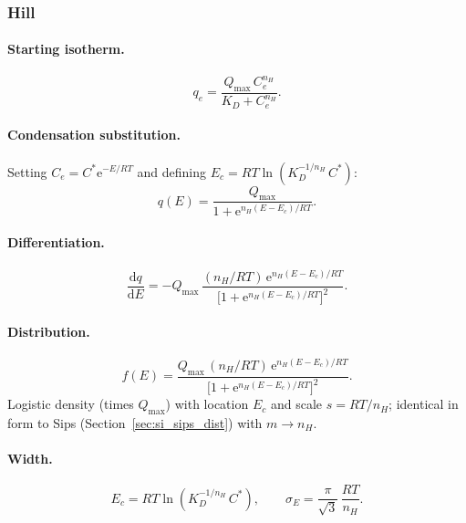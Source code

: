 \documentclass[journal=jacsat,manuscript=article]{achemso}
\begin{document}
\subsubsection{Hill}

\paragraph{Starting isotherm.}
\begin{equation}
	q_e = \frac{Q_{\max}\,C_e^{n_H}}{K_D + C_e^{n_H}}.
\end{equation}

\paragraph{Condensation substitution.}
Setting $C_e = C^{\ast}\mathrm{e}^{-E/RT}$ and defining
$E_c = RT\ln(K_D^{-1/n_H}\,C^{\ast})$:
\begin{equation}
	q(E) = \frac{Q_{\max}}{1+\mathrm{e}^{n_H(E-E_c)/RT}}.
\end{equation}

\paragraph{Differentiation.}
\begin{equation}
	\frac{\mathrm{d}q}{\mathrm{d}E}
	= -Q_{\max}\,\frac{(n_H/RT)\,\mathrm{e}^{n_H(E-E_c)/RT}}
	           {\bigl[1+\mathrm{e}^{n_H(E-E_c)/RT}\bigr]^{2}}.
\end{equation}

\paragraph{Distribution.}
\begin{equation}
	f(E) = \frac{Q_{\max}\,(n_H/RT)\,\mathrm{e}^{n_H(E-E_c)/RT}}
	           {\bigl[1+\mathrm{e}^{n_H(E-E_c)/RT}\bigr]^{2}}.
	\label{eq:si_fE_Hill}
\end{equation}
Logistic density (times $Q_{\max}$) with location $E_c$ and scale $s = RT/n_H$;
identical in form to Sips (Section~\ref{sec:si_sips_dist}) with $m \to n_H$.

\paragraph{Width.}
\begin{equation}
	E_c = RT\ln(K_D^{-1/n_H}\,C^{\ast}),
	\qquad
	\sigma_E = \frac{\pi}{\sqrt{3}}\,\frac{RT}{n_H}.
	\label{eq:si_sigmaE_Hill}
\end{equation}
\end{document}
